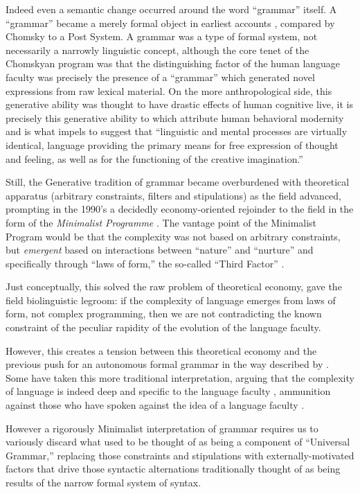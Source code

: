 \documentclass{article}
\begin{document}
Indeed even a semantic change occurred around the word ``grammar'' itself.
A ``grammar'' became a merely formal object in earliest accounts \parencite{chomsky53, chomsky57, chomsky65}, compared by Chomsky to a Post System.
A grammar was a type of formal system, not necessarily a narrowly linguistic concept, although the core tenet of the Chomskyan program was that the distinguishing factor of the human language faculty was precisely the presence of a ``grammar'' which generated novel expressions from raw lexical material.
On the more anthropological side, this generative ability was thought to have drastic effects of human cognitive live, it is precisely this generative ability to which \textcite{berwick15} attribute human behavioral modernity and is what impels \textcite{chomsky66} to suggest that ``linguistic and mental processes are virtually identical, language providing the primary means for free expression of thought and feeling, as well as for the functioning of the creative imagination.''

Still, the Generative tradition of grammar became overburdened with theoretical apparatus (arbitrary constraints, filters and stipulations) as the field advanced, prompting in the 1990's a decidedly economy-oriented rejoinder to the field in the form of the \textit{Minimalist Programme} \parencite{chomsky95}.
The vantage point of the Minimalist Program would be that the complexity was not based on arbitrary constraints, but \emph{emergent} based on interactions between ``nature'' and ``nurture'' and specifically through ``laws of form,'' the so-called ``Third Factor'' \parencite{chomsky05}.

Just conceptually, this solved the raw problem of theoretical economy, gave the field biolinguistic legroom: if the complexity of language emerges from laws of form, not complex programming, then we are not contradicting the known constraint of the peculiar rapidity of the evolution of the language faculty.

However, this creates a tension between this theoretical economy and the previous push for an autonomous formal grammar in the way described by \textcite{chomsky65}.
Some have taken this more traditional interpretation, arguing that the complexity of language is indeed deep and specific to the language faculty \parencite{cinque12} , ammunition against those who have spoken against the idea of a language faculty \parencite{evans09}.

However a rigorously Minimalist interpretation of grammar requires us to variously discard what used to be thought of as being a component of ``Universal Grammar,'' replacing those constraints and stipulations with externally-motivated factors that drive those syntactic alternations traditionally thought of as being results of the narrow formal system of syntax.
\end{document}
